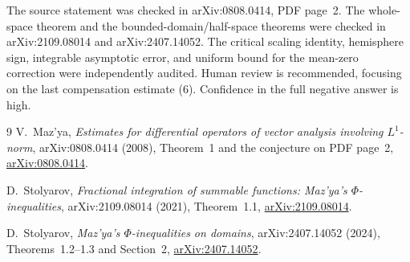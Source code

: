 \documentclass[11pt]{article}
\begin{document}
The source statement was checked in arXiv:0808.0414, PDF page~2.  The
whole-space theorem and the bounded-domain/half-space theorems were checked
in arXiv:2109.08014 and arXiv:2407.14052.  The critical scaling identity,
hemisphere sign, integrable asymptotic error, and uniform bound for the
mean-zero correction were independently audited.  Human review is
recommended, focusing on the last compensation estimate (6).  Confidence in
the full negative answer is high.

\small
\begin{thebibliography}{9}
V.~Maz'ya,
\emph{Estimates for differential operators of vector analysis involving
$L^1$-norm}, arXiv:0808.0414 (2008), Theorem~1 and the conjecture on PDF
page~2, \href{https://arxiv.org/abs/0808.0414}{arXiv:0808.0414}.

D.~Stolyarov,
\emph{Fractional integration of summable functions: Maz'ya's
$\Phi$-inequalities}, arXiv:2109.08014 (2021), Theorem~1.1,
\href{https://arxiv.org/abs/2109.08014}{arXiv:2109.08014}.

D.~Stolyarov,
\emph{Maz'ya's $\Phi$-inequalities on domains}, arXiv:2407.14052 (2024),
Theorems~1.2--1.3 and Section~2,
\href{https://arxiv.org/abs/2407.14052}{arXiv:2407.14052}.
\end{thebibliography}
\end{document}
